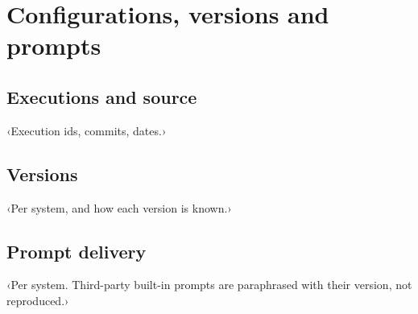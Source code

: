 \clearpage
\section{Configurations, versions and prompts}
\label{app:configs}
\subsection{Executions and source}
‹Execution ids, commits, dates.›
\subsection{Versions}
‹Per system, and how each version is known.›
\subsection{Prompt delivery}
‹Per system. Third-party built-in prompts are paraphrased with their version, not reproduced.›

